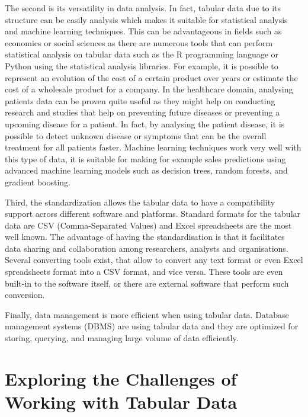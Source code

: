 The second is its versatility in data analysis. In fact, tabular data due to its structure can be easily analysis which makes it suitable for statistical analysis and machine learning techniques. This can be advantageous in fields such as economics or social sciences as there are numerous tools that can perform statistical analysis on tabular data such as the R programming language or Python using the statistical analysis libraries. For example, it is possible to represent an evolution of the cost of a certain product over years or estimate the cost of a wholesale product for a company. In the healthcare domain, analysing patients data can be proven quite useful as they might help on conducting research and studies that help on preventing future diseases or preventing a upcoming disease for a patient. In fact, by analysing the patient disease, it is possible to detect unknown disease or symptoms that can be the overall treatment for all patients faster. Machine learning techniques work very well with this type of data, it is suitable for making for example sales predictions using advanced machine learning models such as decision trees, random forests, and gradient boosting.

Third, the standardization allows the tabular data to have a compatibility support across different software and platforms. Standard formats for the tabular data are CSV (Comma-Separated Values) and Excel spreadsheets are the most well known. The advantage of having the standardisation is that it facilitates data sharing and collaboration among researchers, analysts and organisations. Several converting tools exist, that allow to convert any text format or even Excel spreadsheets format into a CSV format, and vice versa. These tools are even built-in to the software itself, or there are external software that perform such conversion.

Finally, data management is more efficient when using tabular data. Database management systems (DBMS) are using tabular data and they are optimized for storing, querying, and managing large volume of data efficiently. 


\section{Exploring the Challenges of Working with Tabular Data}



